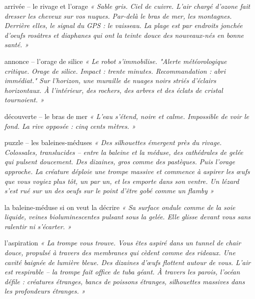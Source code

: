 \documentclass[10pt, a4paper]{article}
\begin{document}
\begin{zonebox}{arrivée -- le rivage et l'orage}
\textit{« Sable gris. Ciel de cuivre. L'air chargé d'ozone fait dresser les cheveux sur vos nuques. Par-delà le bras de mer, les montagnes. Derrière elles, le signal du GPS : le vaisseau. La plage est par endroits jonchée d'oeufs rosâtres et diaphanes qui ont la teinte douce des nouveaux-nés en bonne santé. »}
\end{zonebox}

\begin{momentbox}{annonce -- l'orage de silice}
\textit{« Le robot s'immobilise. "Alerte météorologique critique. Orage de silice. Impact : trente minutes. Recommandation : abri immédiat." Sur l'horizon, une muraille de nuages noirs striés d'éclairs horizontaux. À l'intérieur, des rochers, des arbres et des éclats de cristal tournoient. »}
\end{momentbox}

\begin{obstaclebox}{découverte -- le bras de mer}
\textit{« L'eau s'étend, noire et calme. Impossible de voir le fond. La rive opposée : cinq cents mètres. »}
\end{obstaclebox}

\begin{puzzlebox}{puzzle -- les baleines-méduses}
\textit{« Des silhouettes émergent près du rivage. Colossales, translucides -- entre la baleine et la méduse, des cathédrales de gelée qui pulsent doucement. Des dizaines, gros comme des pastèques. Puis l'orage approche. La créature déploie une trompe massive et commence à aspirer les œufs que vous voyiez plus tôt, un par un, et les emporte dans son ventre. Un lézard s'est rué sur un des oeufs sur le point d'être gobé comme un flamby »}
\end{puzzlebox}

\begin{creaturebox}{la baleine-méduse si on veut la décrire}
\textit{« Sa surface ondule comme de la soie liquide, veines bioluminescentes pulsant sous la gelée. Elle glisse devant vous sans ralentir ni s'écarter. »}
\end{creaturebox}

\begin{momentbox}{l'aspiration}
\textit{« La trompe vous trouve. Vous êtes aspiré dans un tunnel de chair douce, propulsé à travers des membranes qui cèdent comme des rideaux. Une cavité baignée de lumière bleue. Des dizaines d'œufs flottent autour de vous. L'air est respirable -- la trompe fait office de tuba géant. À travers les parois, l'océan défile : créatures étranges, bancs de poissons étranges, silhouettes massives dans les profondeurs étranges. »}
\end{momentbox}
\end{document}
